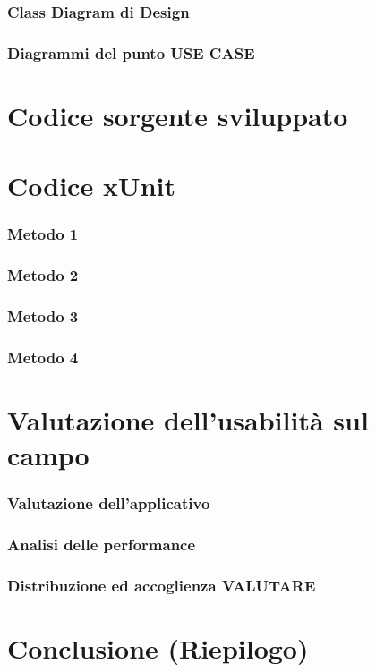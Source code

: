 \documentclass{article}
\begin{document}
		\subsubsection{Class Diagram di Design}
			\subsubsection{Diagrammi del punto USE CASE}
	\section{Codice sorgente sviluppato}
	\section{Codice xUnit}
		\subsubsection{Metodo 1}
		\subsubsection{Metodo 2}
		\subsubsection{Metodo 3}
		\subsubsection{Metodo 4}
	\section{Valutazione dell'usabilità sul campo}
		\subsubsection{Valutazione dell'applicativo}
		\subsubsection{Analisi delle performance}
		\subsubsection{Distribuzione ed accoglienza VALUTARE}
	\section{Conclusione (Riepilogo)}
		
\end{document}
